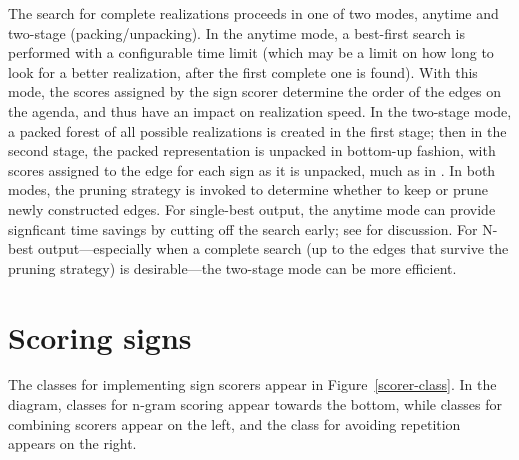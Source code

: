\documentclass[11pt]{article}
\begin{document}
The search for complete realizations proceeds in one of two modes,
anytime and two-stage (packing/unpacking). In the anytime mode, a
best-first search is performed with a configurable time limit (which may
be a limit on how long to look for a better realization, after the first
complete one is found). With this mode, the scores assigned by the sign
scorer determine the order of the edges on the agenda, and thus have an
impact on realization speed. In the two-stage mode, a packed forest of
all possible realizations is created in the first stage; then in the
second stage, the packed representation is unpacked in bottom-up
fashion, with scores assigned to the edge for each sign as it is
unpacked, much as in \cite{Langkilde:2000}. In both modes, the pruning
strategy is invoked to determine whether to keep or prune newly
constructed edges. For single-best output, the anytime mode can provide
signficant time savings by cutting off the search early; see
\cite{White-INLG:2004} for discussion. For N-best output---especially
when a complete search (up to the edges that survive the pruning
strategy) is desirable---the two-stage mode can be more efficient.


\section{Scoring signs}

The classes for implementing sign scorers appear in
Figure~\ref{scorer-class}. In the diagram, classes for n-gram scoring
appear towards the bottom, while classes for combining scorers appear on
the left, and the class for avoiding repetition appears on the right.
\end{document}
